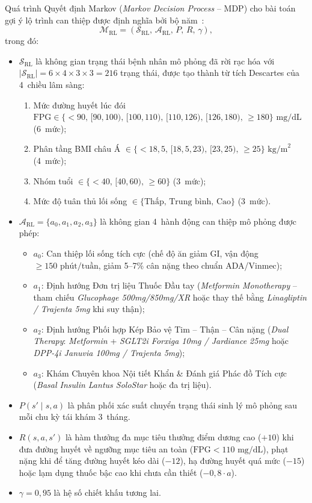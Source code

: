 Quá trình Quyết định Markov (\emph{Markov Decision Process} -- MDP) cho bài toán gợi ý lộ trình can thiệp được định nghĩa bởi bộ năm~\cite{sutton2018}:
\begin{equation}
  \mathcal{M}_{\text{RL}} = (\mathcal{S}_{\text{RL}},\, \mathcal{A}_{\text{RL}},\, P,\, R,\, \gamma),
  \label{eq:mdp-tuple}
\end{equation}
trong đó:
\begin{itemize}
  \item $\mathcal{S}_{\text{RL}}$ là không gian trạng thái bệnh nhân mô phỏng đã rời rạc hóa với $|\mathcal{S}_{\text{RL}}| = 6 \times 4 \times 3 \times 3 = 216$ trạng thái, được tạo thành từ tích Descartes của 4~chiều lâm sàng:
  \begin{enumerate}
    \item Mức đường huyết lúc đói $\text{FPG} \in \{<90,\allowbreak\, [90,100),\allowbreak\, [100,110),\allowbreak\, [110,126),\allowbreak\, [126,180),\allowbreak\, \ge 180\}\text{ mg/dL}$ (6~mức);
    \item Phân tầng BMI châu Á $\in \{<18{,}5,\, [18{,}5,23),\, [23,25),\, \ge 25\}\text{ kg/m}^2$ (4~mức);
    \item Nhóm tuổi $\in \{<40,\, [40,60),\, \ge 60\}$ (3~mức);
    \item Mức độ tuân thủ lối sống $\in \{\text{Thấp},\, \text{Trung bình},\, \text{Cao}\}$ (3~mức).
  \end{enumerate}
  \item $\mathcal{A}_{\text{RL}} = \{a_0, a_1, a_2, a_3\}$ là không gian 4~hành động can thiệp mô phỏng được phép:
  \begin{itemize}
    \item $a_0$: Can thiệp lối sống tích cực (chế độ ăn giảm GI, vận động $\ge 150\text{ phút/tuần}$, giảm 5--7\% cân nặng theo chuẩn ADA/Vinmec);
    \item $a_1$: Định hướng Đơn trị liệu Thuốc Đầu tay (\emph{Metformin Monotherapy} -- tham chiếu \emph{Glucophage 500mg/850mg/XR} hoặc thay thế bằng \emph{Linagliptin / Trajenta 5mg} khi suy thận);
    \item $a_2$: Định hướng Phối hợp Kép Bảo vệ Tim -- Thận -- Cân nặng (\emph{Dual Therapy}: \emph{Metformin} + \emph{SGLT2i Forxiga 10mg / Jardiance 25mg} hoặc \emph{DPP-4i Januvia 100mg / Trajenta 5mg});
    \item $a_3$: Khám Chuyên khoa Nội tiết Khẩn \& Đánh giá Phác đồ Tích cực (\emph{Basal Insulin Lantus SoloStar} hoặc đa trị liệu).
  \end{itemize}
  \item $P(s' \mid s, a)$ là phân phối xác suất chuyển trạng thái sinh lý mô phỏng sau mỗi chu kỳ tái khám 3~tháng.
  \item $R(s, a, s')$ là hàm thưởng đa mục tiêu thưởng điểm dương cao ($+10$) khi đưa đường huyết về ngưỡng mục tiêu an toàn ($\text{FPG} < 110\text{ mg/dL}$), phạt nặng khi để tăng đường huyết kéo dài ($-12$), hạ đường huyết quá mức ($-15$) hoặc lạm dụng thuốc bậc cao khi chưa cần thiết ($-0{,}8 \cdot a$).
  \item $\gamma = 0{,}95$ là hệ số chiết khấu tương lai.
\end{itemize}

